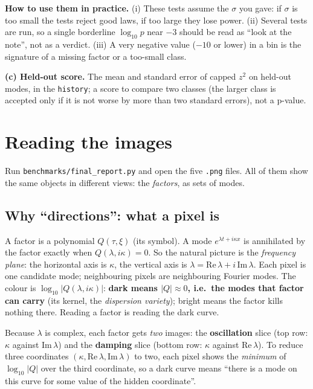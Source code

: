 \documentclass[11pt,a4paper]{article}
\newcommand{\code}[1]{\texttt{#1}}
\begin{document}
\textbf{How to use them in practice.} (i) These tests assume the $\sigma$ you gave: if $\sigma$ is too small the tests reject good laws, if too large they lose power. (ii) Several tests are run, so a single borderline $\log_{10}p$ near $-3$ should be read as ``look at the note'', not as a verdict. (iii) A very negative value ($-10$ or lower) in a bin is the signature of a missing factor or a too-small class.

\textbf{(c) Held-out score.} The mean and standard error of capped $z^2$ on held-out modes, in the \code{history}; a score to compare two classes (the larger class is accepted only if it is not worse by more than two standard errors), not a p-value.

\section{Reading the images}\label{sec:img}
Run \code{benchmarks/final\_report.py} and open the five \code{.png} files. All of them show the same objects in different views: the \emph{factors}, as sets of modes.

\subsection{Why ``directions'': what a pixel is}
A factor is a polynomial $Q(\tau,\xi)$ (its symbol). A mode $e^{\lambda t+i\kappa x}$ is annihilated by the factor exactly when $Q(\lambda,i\kappa)=0$. So the natural picture is the \emph{frequency plane}: the horizontal axis is $\kappa$, the vertical axis is $\lambda=\mathrm{Re}\,\lambda+i\,\mathrm{Im}\,\lambda$. Each pixel is one candidate mode; neighbouring pixels are neighbouring Fourier modes. The colour is $\log_{10}|Q(\lambda,i\kappa)|$: \textbf{dark means $|Q|\approx0$, i.e.\ the modes that factor can carry} (its kernel, the \emph{dispersion variety}); bright means the factor kills nothing there. Reading a factor is reading the dark curve.

Because $\lambda$ is complex, each factor gets \emph{two} images: the \textbf{oscillation} slice (top row: $\kappa$ against $\mathrm{Im}\,\lambda$) and the \textbf{damping} slice (bottom row: $\kappa$ against $\mathrm{Re}\,\lambda$). To reduce three coordinates $(\kappa,\mathrm{Re}\,\lambda,\mathrm{Im}\,\lambda)$ to two, each pixel shows the \emph{minimum} of $\log_{10}|Q|$ over the third coordinate, so a dark curve means ``there is a mode on this curve for some value of the hidden coordinate''.
\end{document}

